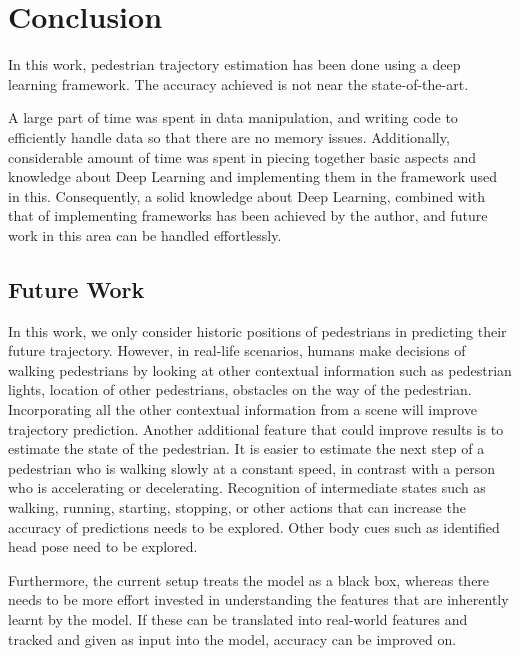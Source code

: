 \chapter{Conclusion}

In this work, pedestrian trajectory estimation has been done using a deep learning framework. The accuracy achieved is not near the state-of-the-art. 

A large part of time was spent in data manipulation, and writing code to efficiently handle data so that there are no memory issues. Additionally, considerable amount of time was spent in piecing together basic aspects and knowledge about Deep Learning and implementing them in the framework used in this. Consequently, a solid knowledge about Deep Learning, combined with that of implementing frameworks has been achieved by the author, and future work in this area can be handled effortlessly.
\section{Future Work}


In this work, we only consider historic positions of pedestrians in predicting their future trajectory. However, in real-life scenarios, humans make decisions of walking pedestrians by looking at other contextual information such as pedestrian lights, location of other pedestrians, obstacles on the way of the pedestrian. Incorporating all the other contextual information from a scene will improve trajectory prediction. Another additional feature that could improve results is to estimate the state of the pedestrian. It is easier to estimate the next step of a pedestrian who is walking slowly at a constant speed, in contrast with a person who is accelerating or decelerating. Recognition of intermediate states such as walking, running, starting, stopping, or other actions that can increase the accuracy of predictions needs to be explored. Other body cues such as identified head pose need to be explored.

Furthermore, the current setup treats the model as a black box, whereas there needs to be more effort invested in understanding the features that are inherently learnt by the model. If these can be translated into real-world features and tracked and given as input into the model, accuracy can be improved on.